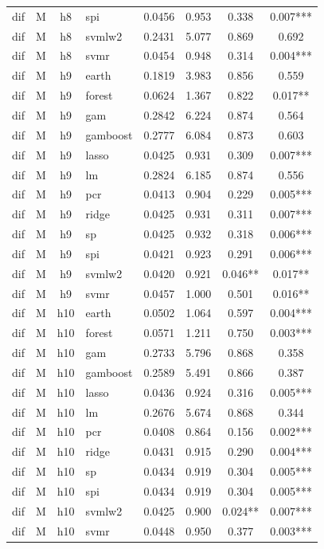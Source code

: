 \begin{ThreePartTable}
\begin{longtable}[t]{llclcccc}
dif & M & h8 & spi & 0.0456 & 0.953 & 0.338 & 0.007***\\
dif & M & h8 & svmlw2 & 0.2431 & 5.077 & 0.869 & 0.692\\
dif & M & h8 & svmr & 0.0454 & 0.948 & 0.314 & 0.004***\\
\addlinespace
dif & M & h9 & earth & 0.1819 & 3.983 & 0.856 & 0.559\\
dif & M & h9 & forest & 0.0624 & 1.367 & 0.822 & 0.017**\\
dif & M & h9 & gam & 0.2842 & 6.224 & 0.874 & 0.564\\
dif & M & h9 & gamboost & 0.2777 & 6.084 & 0.873 & 0.603\\
dif & M & h9 & lasso & 0.0425 & 0.931 & 0.309 & 0.007***\\
dif & M & h9 & lm & 0.2824 & 6.185 & 0.874 & 0.556\\
dif & M & h9 & pcr & 0.0413 & 0.904 & 0.229 & 0.005***\\
dif & M & h9 & ridge & 0.0425 & 0.931 & 0.311 & 0.007***\\
dif & M & h9 & sp & 0.0425 & 0.932 & 0.318 & 0.006***\\
dif & M & h9 & spi & 0.0421 & 0.923 & 0.291 & 0.006***\\
dif & M & h9 & svmlw2 & 0.0420 & 0.921 & 0.046** & 0.017**\\
dif & M & h9 & svmr & 0.0457 & 1.000 & 0.501 & 0.016**\\
\addlinespace
dif & M & h10 & earth & 0.0502 & 1.064 & 0.597 & 0.004***\\
dif & M & h10 & forest & 0.0571 & 1.211 & 0.750 & 0.003***\\
dif & M & h10 & gam & 0.2733 & 5.796 & 0.868 & 0.358\\
dif & M & h10 & gamboost & 0.2589 & 5.491 & 0.866 & 0.387\\
dif & M & h10 & lasso & 0.0436 & 0.924 & 0.316 & 0.005***\\
dif & M & h10 & lm & 0.2676 & 5.674 & 0.868 & 0.344\\
dif & M & h10 & pcr & 0.0408 & 0.864 & 0.156 & 0.002***\\
dif & M & h10 & ridge & 0.0431 & 0.915 & 0.290 & 0.004***\\
dif & M & h10 & sp & 0.0434 & 0.919 & 0.304 & 0.005***\\
dif & M & h10 & spi & 0.0434 & 0.919 & 0.304 & 0.005***\\
dif & M & h10 & svmlw2 & 0.0425 & 0.900 & 0.024** & 0.007***\\
dif & M & h10 & svmr & 0.0448 & 0.950 & 0.377 & 0.003***\\

\end{longtable}
\end{ThreePartTable}
